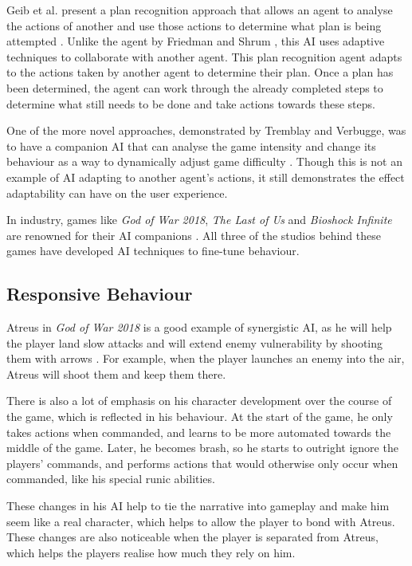 \documentclass{IEEEtran}
\begin{document}
Geib et al. present a plan recognition approach that allows an agent to analyse the actions of another and use those actions to determine what plan is being attempted \cite{GeneratingCollabBehaviourPlanRecognition2016}. Unlike the agent by Friedman and Shrum \cite{CompanionBotsFPS2019}, this AI uses adaptive techniques to collaborate with another agent. This plan recognition agent adapts to the actions taken by another agent to determine their plan. Once a plan has been determined, the agent can work through the already completed steps to determine what still needs to be done and take actions towards these steps.

One of the more novel approaches, demonstrated by Tremblay and Verbugge, was to have a companion AI that can analyse the game intensity and change its behaviour as a way to dynamically adjust game difficulty \cite{tremblay2013adaptive}. Though this is not an example of AI adapting to another agent's actions, it still demonstrates the effect adaptability can have on the user experience.

In industry, games like \textit{God of War 2018}, \textit{The Last of Us} and \textit{Bioshock Infinite} are renowned for their AI companions \cite{PlayDontShow}. All three of the studios behind these games have developed AI techniques to fine-tune behaviour.

\subsection{Responsive Behaviour}
\label{Responsive Behaviour}

Atreus in \textit{God of War 2018} is a good example of synergistic AI, as he will help the player land slow attacks and will extend enemy vulnerability by shooting them with arrows \cite{GDCAtreus}. For example, when the player launches an enemy into the air, Atreus will shoot them and keep them there.

There is also a lot of emphasis on his character development over the course of the game, which is reflected in his behaviour. At the start of the game, he only takes actions when commanded, and learns to be more automated towards the middle of the game. Later, he becomes brash, so he starts to outright ignore the players’ commands, and performs actions that would otherwise only occur when commanded, like his special runic abilities.

These changes in his AI help to tie the narrative into gameplay and make him seem like a real character, which helps to allow the player to bond with Atreus. These changes are also noticeable when the player is separated from Atreus, which helps the players realise how much they rely on him.
\end{document}
